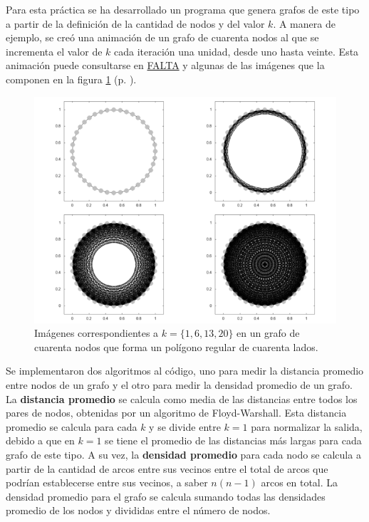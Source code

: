 \documentclass{article}
\begin{document}
  Para esta práctica se ha desarrollado un programa que genera grafos de este tipo a partir de la definición de la cantidad de nodos y del valor $k$. A manera de ejemplo, se creó una animación de un grafo de cuarenta nodos al que se incrementa el valor de $k$ cada iteración una unidad, desde uno hasta veinte. Esta animación puede consultarse en \url{FALTA} y algunas de las imágenes que la componen en la figura \ref{grafoEjemplo20} (p. \pageref{grafoEjemplo20}).

  \begin{figure}[h]
    \includegraphics[width=1\textwidth]{grafoEjemplo20}
    \centering
    \caption{Imágenes correspondientes a $k = \{ 1, 6, 13, 20 \}$ en un grafo de cuarenta nodos que forma un polígono regular de cuarenta lados.}
    \label{grafoEjemplo20}
  \end{figure}

  Se implementaron dos algoritmos al código, uno para medir la distancia promedio entre nodos de un grafo y el otro para medir la densidad promedio de un grafo. La \textbf{distancia promedio} se calcula como media de las distancias entre todos los pares de nodos, obtenidas por un algoritmo de Floyd-Warshall. Esta distancia promedio se calcula para cada $k$ y se divide entre $k = 1$ para normalizar la salida, debido a que en $k = 1$ se tiene el promedio de las distancias más largas para cada grafo de este tipo. A su vez, la \textbf{densidad promedio} para cada nodo se calcula a partir de la cantidad de arcos entre sus vecinos entre el total de arcos que podrían establecerse entre sus vecinos, a saber $n (n -1)$ arcos en total. La densidad promedio para el grafo se calcula sumando todas las densidades promedio de los nodos y divididas entre el número de nodos.
\end{document}
